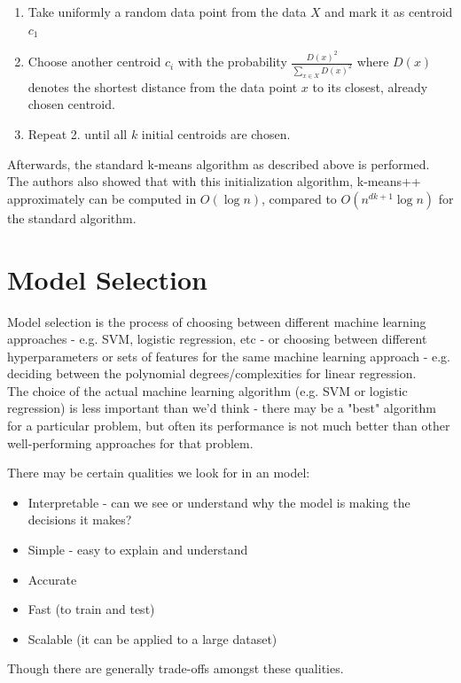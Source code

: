 \begin{enumerate}
    \item Take uniformly a random data point from the data $X$ and mark it as centroid $c_1$
    \item Choose another centroid $c_i$ with the probability $\frac{D(x)^2}{\sum_{x \in X} D(x)^2}$ where $D(x)$ denotes the shortest distance from the data point $x$ to its closest, already chosen centroid.
    \item Repeat 2. until all $k$ initial centroids are chosen.
\end{enumerate}

Afterwards, the standard k-means algorithm as described above is performed. The authors also showed that with this initialization algorithm, k-means++ approximately can be computed in $O(\log n)$, compared to $O(n^{dk+1} \log n)$ for the standard algorithm.


\newpage
\section{Model Selection } \label{ms}
Model selection is the process of choosing between different machine learning approaches - e.g. SVM, logistic regression, etc - or choosing between different hyperparameters or sets of features for the same machine learning approach - e.g. deciding between the polynomial degrees/complexities for linear regression.\\
The choice of the actual machine learning algorithm (e.g. SVM or logistic regression) is less important than we'd think - there may be a "best" algorithm for a particular problem, but often its performance is not much better than other well-performing approaches for that problem.

There may be certain qualities we look for in an model:

\begin{itemize}
\item Interpretable - can we see or understand why the model is making the decisions it makes?
\item Simple - easy to explain and understand
\item Accurate
\item Fast (to train and test)
\item Scalable (it can be applied to a large dataset)

\end{itemize}
Though there are generally trade-offs amongst these qualities.

